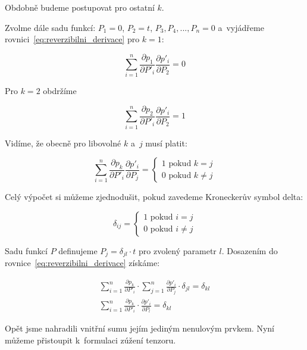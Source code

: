 Obdobně budeme postupovat pro ostatní \(k\).

Zvolme dále sadu funkcí: \(P_1 = 0\), \(P_2 = t\), \(P_3, P_4, ..., P_n = 0\) a~vyjádřeme rovnici~\eqref{eq:reverzibilni_derivace} pro \(k = 1\):

\begin{equation}
\sum_{i=1}^n \frac{\partial p_1}{\partial P'_i} \frac{\partial p'_i}{\partial P_2} = 0
\end{equation}

Pro \(k = 2\) obdržíme

\begin{equation}
\sum_{i=1}^n \frac{\partial p_2}{\partial P'_i} \frac{\partial p'_i}{\partial P_2} = 1
\end{equation}

Vidíme, že obecně pro libovolné \(k\) a~\(j\) musí platit:

\begin{equation}
\sum_{i=1}^n \frac{\partial p_k}{\partial P'_i} \frac{\partial p'_i}{\partial P_j} =
\begin{cases}
	1 \text{ pokud } k = j \\
	0 \text{ pokud } k \neq j
\end{cases}
\end{equation}

Celý výpočet si můžeme zjednodušit, pokud zavedeme Kroneckerův symbol delta:

\begin{equation}
\delta_{ij} =
\begin{cases}
	1 \text{ pokud } i = j \\
	0 \text{ pokud } i \neq j
\end{cases}
\end{equation}

Sadu funkcí \(P\) definujeme \(P_j = \delta_{jl} \cdot t\) pro zvolený parametr \(l\). Dosazením do rovnice~\eqref{eq:reverzibilni_derivace} získáme:

\begin{equation}
\label{eq:vztah_mezi_bazemi}
\begin{split}
\sum_{i=1}^n \frac{\partial p_k}{\partial P'_i} \cdot \sum_{j=1}^n \frac{\partial p'_i}{\partial P_j} \cdot \delta_{jl} = \delta_{kl} \\
\sum_{i=1}^n \frac{\partial p_k}{\partial P'_i} \cdot \frac{\partial p'_i}{\partial P_l} = \delta_{kl}
\end{split}
\end{equation}

Opět jsme nahradili vnitřní sumu jejím jediným nenulovým prvkem. Nyní můžeme přistoupit k~formulaci zúžení tenzoru. 

